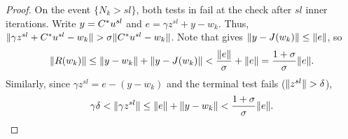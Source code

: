 \documentclass[11pt]{article}
\begin{document}
\begin{proof}
    On the event $\{N_k > sl\}$, both tests in  fail at the check after $sl$ inner iterations.
    Write $y = {C}^*u^{sl}$ and $e = \gamma z^{sl} + y - w_k$.
    Thus, $\lVert\gamma z^{sl} + {C}^* u^{sl} - w_k\rVert > \sigma \lVert{C}^* u^{sl} - w_k\rVert$.
    Note that  gives $\lVert y - J(w_k)\rVert\leq\lVert e\rVert$, so
    \begin{align}
        \lVert R(w_k)\rVert \leq \lVert y - w_k\rVert + \lVert y - J(w_k)\rVert < \frac{\lVert e\rVert}{\sigma} + \lVert e\rVert = \frac{1+\sigma}{\sigma}\lVert e\rVert.
    \end{align}
    Similarly, since $\gamma z^{sl} = e - (y - w_k)$ and the terminal test fails ($\lVert z^{sl}\rVert > \delta$),
    \begin{align}
        \gamma\delta < \lVert\gamma z^{sl}\rVert \leq \lVert e\rVert + \lVert y - w_k\rVert < \frac{1+\sigma}{\sigma}\lVert e\rVert.
    \end{align}


\end{proof}
\end{document}
